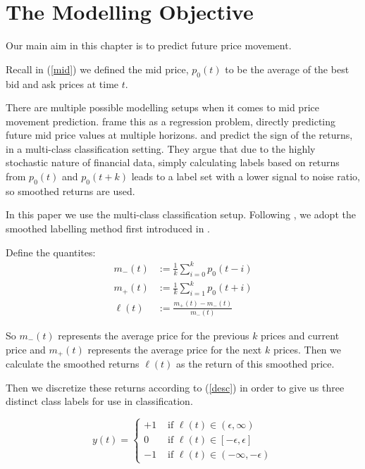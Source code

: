 \documentclass[a4paper, oneside, notitlepage]{book}
\begin{document}
\section{The Modelling Objective}

Our main aim in this chapter is to predict future price movement.

Recall in (\ref{mid}) we defined the mid price, $p_0(t)$ to be the average of the best bid and ask prices at time $t$.

There are multiple possible modelling setups when it comes to mid price movement prediction.
\cite{KOLM2023} frame this as a regression problem, directly predicting future mid price values at multiple horizons.
\cite{ZHANG2019} and \cite{LUCCHESE2024} predict the sign of the returns, in a multi-class classification setting.
They argue that due to the highly stochastic nature of financial data, simply calculating labels based on returns from $p_{0}(t)$ and $p_{0}(t+k)$ 
leads to a label set with a lower signal to noise ratio, so smoothed returns are used.

In this paper we use the multi-class classification setup.
Following \cite{ZHANG2019}, we adopt the smoothed labelling method first introduced in \cite{AVRAAM2017}.

Define the quantites:
\begin{align}
    m_{-}(t) &:= \frac{1}{k} \sum_{i=0}^{k} p_0(t-i) \\
    m_{+}(t) &:= \frac{1}{k} \sum_{i=1}^{k} p_0(t+i) \\
    \ell(t) &:= \frac{m_{+}(t) - m_{-}(t)}{m_{-}(t)}
    \label{smoothed_returns}
\end{align}

So $m_{-}(t)$ represents the average price for the previous $k$ prices and current price
and $m_{+}(t)$ represents the average price for the next $k$ prices.
Then we calculate the smoothed returns $\ell(t)$ as the return of this smoothed price. 

Then we discretize these returns according to (\ref{desc}) in order to give us three distinct class labels for use in classification.

\begin{equation}
    y(t) = \begin{cases} \label{desc}
        +1  & \text{ if } \ell(t) \in (\epsilon, \infty) \\
        0  & \text{ if } \ell(t) \in [-\epsilon, \epsilon] \\
       -1  & \text{ if } \ell(t) \in  (-\infty, -\epsilon)
   \end{cases}
\end{equation}
\end{document}
